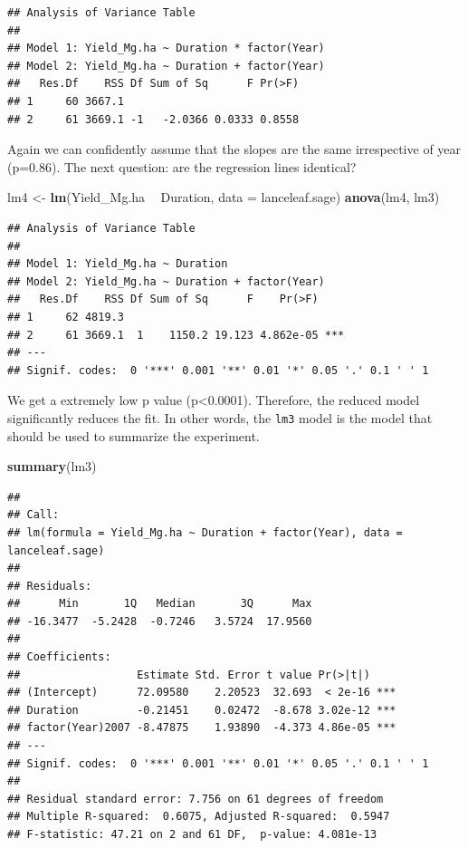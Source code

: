 \documentclass[letterpaper,]{book}
\newenvironment{Shaded}{\begin{snugshade}}{\end{snugshade}}
\newcommand{\DataTypeTok}[1]{\textcolor[rgb]{0.13,0.29,0.53}{#1}}
\newcommand{\KeywordTok}[1]{\textcolor[rgb]{0.13,0.29,0.53}{\textbf{#1}}}
\newcommand{\NormalTok}[1]{#1}
\newcommand{\OperatorTok}[1]{\textcolor[rgb]{0.81,0.36,0.00}{\textbf{#1}}}
\newcommand{\StringTok}[1]{\textcolor[rgb]{0.31,0.60,0.02}{#1}}
\begin{document}
\begin{verbatim}
## Analysis of Variance Table
## 
## Model 1: Yield_Mg.ha ~ Duration * factor(Year)
## Model 2: Yield_Mg.ha ~ Duration + factor(Year)
##   Res.Df    RSS Df Sum of Sq      F Pr(>F)
## 1     60 3667.1                           
## 2     61 3669.1 -1   -2.0366 0.0333 0.8558
\end{verbatim}

Again we can confidently assume that the slopes are the same irrespective of year (p=0.86). The next question: are the regression lines identical?

\begin{Shaded}
\begin{Highlighting}[]
\NormalTok{lm4 <-}\StringTok{ }\KeywordTok{lm}\NormalTok{(Yield_Mg.ha }\OperatorTok{~}\StringTok{ }\NormalTok{Duration, }\DataTypeTok{data =}\NormalTok{ lanceleaf.sage)}
\KeywordTok{anova}\NormalTok{(lm4, lm3) }
\end{Highlighting}
\end{Shaded}

\begin{verbatim}
## Analysis of Variance Table
## 
## Model 1: Yield_Mg.ha ~ Duration
## Model 2: Yield_Mg.ha ~ Duration + factor(Year)
##   Res.Df    RSS Df Sum of Sq      F    Pr(>F)    
## 1     62 4819.3                                  
## 2     61 3669.1  1    1150.2 19.123 4.862e-05 ***
## ---
## Signif. codes:  0 '***' 0.001 '**' 0.01 '*' 0.05 '.' 0.1 ' ' 1
\end{verbatim}

We get a extremely low p value (p\textless{}0.0001). Therefore, the reduced model significantly reduces the fit. In other words, the \texttt{lm3} model is the model that should be used to summarize the experiment.

\begin{Shaded}
\begin{Highlighting}[]
\KeywordTok{summary}\NormalTok{(lm3)}
\end{Highlighting}
\end{Shaded}

\begin{verbatim}
## 
## Call:
## lm(formula = Yield_Mg.ha ~ Duration + factor(Year), data = lanceleaf.sage)
## 
## Residuals:
##      Min       1Q   Median       3Q      Max 
## -16.3477  -5.2428  -0.7246   3.5724  17.9560 
## 
## Coefficients:
##                  Estimate Std. Error t value Pr(>|t|)    
## (Intercept)      72.09580    2.20523  32.693  < 2e-16 ***
## Duration         -0.21451    0.02472  -8.678 3.02e-12 ***
## factor(Year)2007 -8.47875    1.93890  -4.373 4.86e-05 ***
## ---
## Signif. codes:  0 '***' 0.001 '**' 0.01 '*' 0.05 '.' 0.1 ' ' 1
## 
## Residual standard error: 7.756 on 61 degrees of freedom
## Multiple R-squared:  0.6075, Adjusted R-squared:  0.5947 
## F-statistic: 47.21 on 2 and 61 DF,  p-value: 4.081e-13
\end{verbatim}
\end{document}
